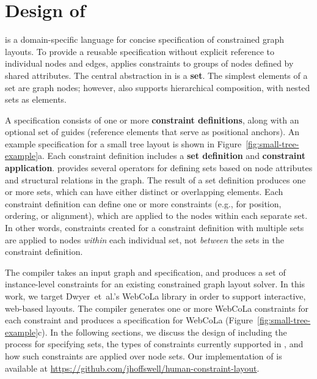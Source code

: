 \section{Design of \projectname}
\projectname is a domain-specific language for concise specification of 
constrained graph layouts. To provide a reusable specification 
without explicit reference to individual nodes and edges, \projectname
applies constraints to groups of nodes defined by shared attributes. 
The central abstraction in \projectname is a \textbf{set}. The 
simplest elements of a set are graph nodes; however, \projectname also
supports hierarchical composition, with nested sets as elements.

A \projectname specification consists of one or more \textbf{constraint definitions},
along with an optional set of guides (reference elements that serve as 
positional anchors). An example \projectname specification for a small tree 
layout is shown in Figure~\ref{fig:small-tree-example}a. Each constraint 
definition includes a \textbf{set definition} and \textbf{constraint application}.
\projectname provides several operators for defining
sets based on node attributes and structural relations in the graph.
The result of a set definition produces one or more sets, which 
can have either distinct or overlapping elements. Each constraint definition can 
define one or more constraints (e.g., for position, ordering, 
or alignment), which are applied to the nodes within each separate set. 
In other words, constraints created for a constraint definition with multiple sets are 
applied to nodes \emph{within} each individual set, not \emph{between} 
the sets in the constraint definition.

The \projectname compiler takes an input graph 
and specification, and produces a set of instance-level constraints for 
an existing constrained graph layout solver. In this work, we target 
Dwyer~et~al.'s WebCoLa library \cite{WebCoLa} in order to support
interactive, web-based layouts. The \projectname compiler generates one
or more WebCoLa constraints for each \projectname constraint and produces a
specification for WebCoLa (Figure~\ref{fig:small-tree-example}c).
 In the following sections, 
we discuss the design of \projectname including the process for 
specifying sets, the types of constraints currently supported in \projectname, 
and how such constraints are applied over node sets. 
Our implementation of \projectname is available at 
\url{https://github.com/jhoffswell/human-constraint-layout}.


